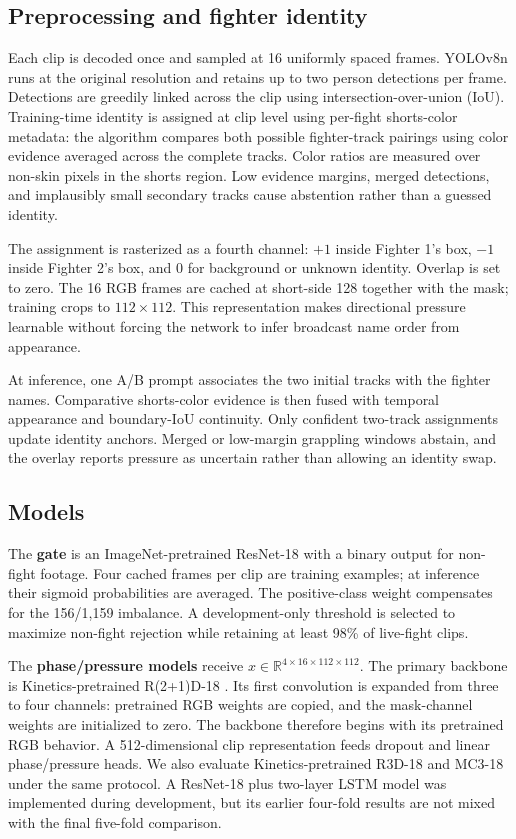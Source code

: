 \documentclass[10pt,twocolumn]{article}
\newcommand{\Rtwo}{R(2+1)D}
\begin{document}
\subsection{Preprocessing and fighter identity}

Each clip is decoded once and sampled at 16 uniformly spaced frames. YOLOv8n runs at the original resolution and retains up to two person detections per frame. Detections are greedily linked across the clip using intersection-over-union (IoU). Training-time identity is assigned at clip level using per-fight shorts-color metadata: the algorithm compares both possible fighter-track pairings using color evidence averaged across the complete tracks. Color ratios are measured over non-skin pixels in the shorts region. Low evidence margins, merged detections, and implausibly small secondary tracks cause abstention rather than a guessed identity.

The assignment is rasterized as a fourth channel: $+1$ inside Fighter 1's box, $-1$ inside Fighter 2's box, and $0$ for background or unknown identity. Overlap is set to zero. The 16 RGB frames are cached at short-side 128 together with the mask; training crops to $112\times112$. This representation makes directional pressure learnable without forcing the network to infer broadcast name order from appearance.

At inference, one A/B prompt associates the two initial tracks with the fighter names. Comparative shorts-color evidence is then fused with temporal appearance and boundary-IoU continuity. Only confident two-track assignments update identity anchors. Merged or low-margin grappling windows abstain, and the overlay reports pressure as uncertain rather than allowing an identity swap.

\subsection{Models}

The \textbf{gate} is an ImageNet-pretrained ResNet-18 with a binary output for non-fight footage. Four cached frames per clip are training examples; at inference their sigmoid probabilities are averaged. The positive-class weight compensates for the 156/1,159 imbalance. A development-only threshold is selected to maximize non-fight rejection while retaining at least 98\% of live-fight clips.

The \textbf{phase/pressure models} receive $x\in\mathbb{R}^{4\times16\times112\times112}$. The primary backbone is Kinetics-pretrained \Rtwo-18 \cite{tran2018closer}. Its first convolution is expanded from three to four channels: pretrained RGB weights are copied, and the mask-channel weights are initialized to zero. The backbone therefore begins with its pretrained RGB behavior. A 512-dimensional clip representation feeds dropout and linear phase/pressure heads. We also evaluate Kinetics-pretrained R3D-18 and MC3-18 under the same protocol. A ResNet-18 plus two-layer LSTM model was implemented during development, but its earlier four-fold results are not mixed with the final five-fold comparison.
\end{document}
